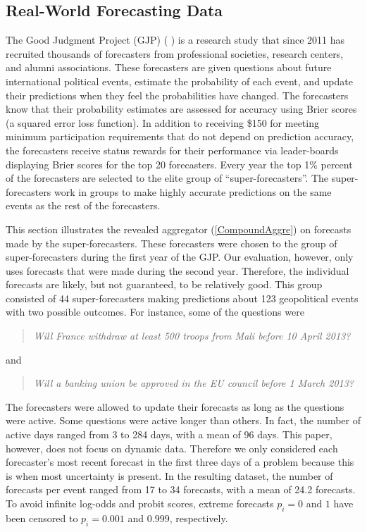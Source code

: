 \documentclass[11pt]{article}
\theoremstyle{definition}
\theoremstyle{definition}
\begin{document}
\subsection{Real-World Forecasting Data}
\label{realData}
The Good Judgment Project (GJP) ( \citealt{mellers2014psychological,
ungar2012good}) is a research study that since 2011 has recruited
thousands of forecasters from professional societies, research
centers, and alumni associations.  These forecasters are given
questions about future international political events, estimate the
probability of each event, and update their predictions when they feel
the probabilities have changed.  The forecasters know that their
probability estimates are assessed for accuracy using Brier scores (a
squared error loss function).  In addition to receiving \$150 for
meeting minimum participation requirements that do not depend on
prediction accuracy, the forecasters receive status rewards for their
performance via leader-boards displaying Brier scores for the top 20
forecasters.  Every year the top 1\% percent of the forecasters are
selected to the elite group of ``super-forecasters''. The
super-forecasters work in groups to make highly accurate predictions
on the same events as the rest of the forecasters.

This section illustrates the revealed aggregator (\ref{CompoundAggre})
on forecasts made by the super-forecasters. These forecasters were
chosen to the group of super-forecasters during the first year of the
GJP. Our evaluation, however, only uses forecasts that were made
during the second year. Therefore, the individual forecasts are
likely, but not guaranteed, to be relatively good. This group
consisted of 44 super-forecasters making predictions about 123
geopolitical events with two possible outcomes. For instance, some of
the questions were
\begin{quote}\textit{
Will France withdraw at least 500 troops from Mali before 10 April 2013?
}\end{quote}
and
\begin{quote}\textit{
Will a banking union be approved in the EU council before 1 March 2013? 
}
\end{quote}
 The forecasters were allowed to update their forecasts as long as the
questions were active. Some questions were active longer than
others. In fact, the number of active days ranged from 3 to 284 days,
with a mean of 96 days. This paper, however, does not focus on dynamic
data. Therefore we only considered each forecaster's most
recent forecast in the first three days of a problem because this is
when most uncertainty is present.  
In the resulting
dataset, the number of forecasts per event ranged from 17 to 34
forecasts, with a mean of 24.2 forecasts. To avoid infinite log-odds
and probit scores, extreme forecasts $p_i = 0$ and $1$ have been
censored to $p_i = 0.001$ and $0.999$, respectively.
 
\end{document}
